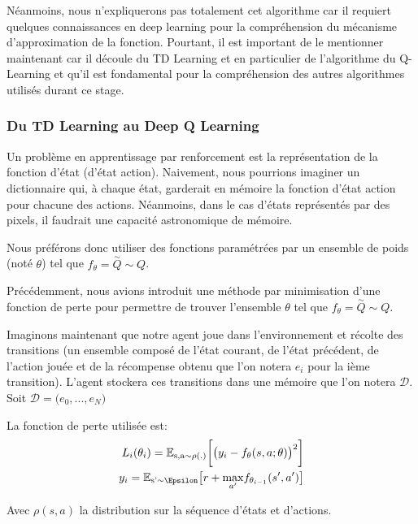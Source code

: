 Néanmoins, nous n'expliquerons pas totalement cet algorithme car il requiert quelques connaissances en deep learning pour la compréhension du mécanisme d'approximation de la fonction. Pourtant, il est important de le mentionner maintenant car il découle du TD Learning et en particulier de l'algorithme du Q-Learning et qu'il est fondamental pour la compréhension des autres algorithmes utilisés durant ce stage.

\subsubsection{Du TD Learning au Deep Q Learning}

Un problème en apprentissage par renforcement est la représentation de la fonction d'état (d'état action). Naivement, nous pourrions imaginer un dictionnaire qui, à chaque état, garderait en mémoire la fonction d'état action pour chacune des actions. Néanmoins, dans le cas d'états représentés par des pixels, il faudrait une capacité astronomique de mémoire. 

Nous préférons donc utiliser des fonctions paramétrées par un ensemble de poids (noté $\theta$) tel que $f_\theta = \overset{\sim}{Q} \sim Q$. 

Précédemment, nous avions introduit une méthode par minimisation d'une fonction de perte pour permettre de trouver l'ensemble $\theta$ tel que $f_\theta = \overset{\sim}{Q} \sim Q$. 

Imaginons maintenant que notre agent joue dans l'environnement et récolte des transitions (un ensemble composé de l'état courant, de l'état précédent, de l'action jouée et de la récompense obtenu que l'on notera $e_i$ pour la ième transition). L'agent stockera ces transitions dans une mémoire que l'on notera $\mathcal{D}$. Soit $\mathcal{D} = \big(e_0, ..., e_N\big)$ 

La fonction de perte utilisée est: 
\begin{align}
L_i(\theta_i) = \mathbb{E_{\text{s}, \text{a} \sim \rho(.)}}\bigg[ \big( y_i - f_\theta(s, a; \theta)\big)^2 \bigg]\\
y_i = \mathbb{E}_{\text{s'} \sim \Epsilon}\big[r + \underset{a'}{\max}f_{\theta_{i-1}}(s', a') \big] 
\end{align}

Avec $\rho(s, a)$ la distribution sur la séquence d'états et d'actions.
